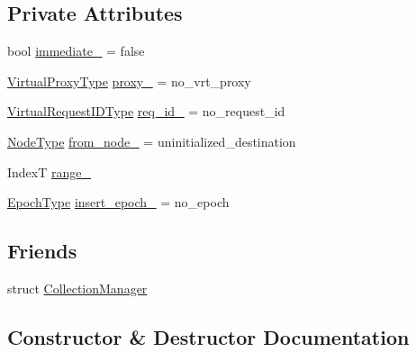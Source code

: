 \subsection*{Private Attributes}
\begin{DoxyCompactItemize}
\item 
bool \hyperlink{structvt_1_1vrt_1_1collection_1_1_collection_info_abee4e28cb909a7e5996274f916138c5e}{immediate\+\_\+} = false
\item 
\hyperlink{namespacevt_a1b417dd5d684f045bb58a0ede70045ac}{Virtual\+Proxy\+Type} \hyperlink{structvt_1_1vrt_1_1collection_1_1_collection_info_abd78f51bda97488527296a6d3535bc06}{proxy\+\_\+} = no\+\_\+vrt\+\_\+proxy
\item 
\hyperlink{namespacevt_1_1vrt_ac7ef8820ebfc383fa16f09bf46eaa2b8}{Virtual\+Request\+I\+D\+Type} \hyperlink{structvt_1_1vrt_1_1collection_1_1_collection_info_a8c14351c09d5dc5464e500b2f2de1fe3}{req\+\_\+id\+\_\+} = no\+\_\+request\+\_\+id
\item 
\hyperlink{namespacevt_a866da9d0efc19c0a1ce79e9e492f47e2}{Node\+Type} \hyperlink{structvt_1_1vrt_1_1collection_1_1_collection_info_a16213a751f7753963ab2671ecab931d3}{from\+\_\+node\+\_\+} = uninitialized\+\_\+destination
\item 
IndexT \hyperlink{structvt_1_1vrt_1_1collection_1_1_collection_info_a1af3d29f3eaab71b2753c85a90900d63}{range\+\_\+}
\item 
\hyperlink{namespacevt_a985a5adf291c34a3ca263b3378388236}{Epoch\+Type} \hyperlink{structvt_1_1vrt_1_1collection_1_1_collection_info_abe7f0fcf0590be1b024236b1df101149}{insert\+\_\+epoch\+\_\+} = no\+\_\+epoch
\end{DoxyCompactItemize}
\subsection*{Friends}
\begin{DoxyCompactItemize}
\item 
struct \hyperlink{structvt_1_1vrt_1_1collection_1_1_collection_info_af9288b1963f434a90b307b5305a49510}{Collection\+Manager}
\end{DoxyCompactItemize}


\subsection{Constructor \& Destructor Documentation}
\mbox{\label{structvt_1_1vrt_1_1collection_1_1_collection_info_a92a25c0c5f12cc3e97b60ef8d011a348}} 
